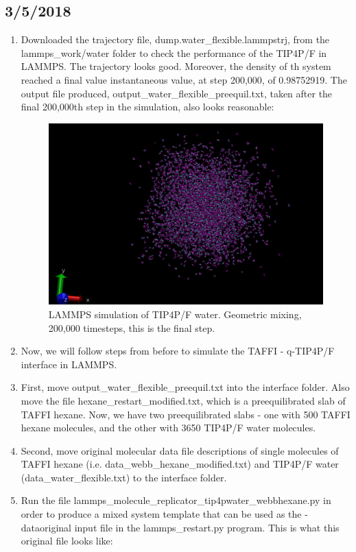 \documentclass[12pt,reqno]{amsart}
\numberwithin{equation}{section}
\begin{document}
\subsection{3/5/2018}
\begin{enumerate}
\item Downloaded the trajectory file, dump.water\_flexible.lammpstrj, from the lammps\_work/water folder to check the performance of the TIP4P/F in LAMMPS.  The trajectory looks good.  Moreover, the density of th system reached a final value instantaneous value, at step 200,000, of 0.98752919.  The output file produced, output\_water\_flexible\_preequil.txt, taken after the final 200,000th step in the simulation, also looks reasonable:

 \begin{figure}[H]
\centering
\includegraphics[scale=0.4]{lammps_tip4pF_200000}
\caption{LAMMPS simulation of TIP4P/F water.  Geometric mixing, 200,000 timesteps, this is the final step.}
\end{figure}

\item Now, we will follow steps from before to simulate the TAFFI - q-TIP4P/F interface in LAMMPS.  
\item First, move output\_water\_flexible\_preequil.txt into the interface folder.  Also move the file hexane\_restart\_modified.txt, which is  a preequilibrated slab of TAFFI hexane.  Now, we have two preequilibrated slabs - one with 500 TAFFI hexane molecules, and the other with 3650 TIP4P/F water molecules. 
\item Second, move original molecular data file descriptions of single molecules of TAFFI hexane (i.e. data\_webb\_hexane\_modified.txt) and TIP4P/F water (data\_water\_flexible.txt) to the interface folder.  
\item Run the file lammps\_molecule\_replicator\_tip4pwater\_webbhexane.py in order to produce a mixed system template that can be used as the -dataoriginal input file in the lammps\_restart.py program.  This is what this original file looks like:


\end{enumerate}
\end{document}
